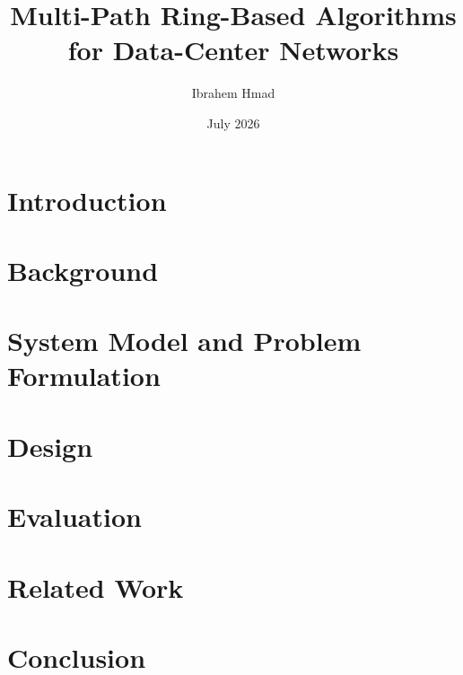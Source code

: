 \documentclass{article}
\title{Multi-Path Ring-Based Algorithms for Data-Center Networks}
\author{Ibrahem Hmad}
\date{July 2026}
\begin{document}
\maketitle

\begin{abstract}

\end{abstract}

\section{Introduction}
\section{Background}
\section{System Model and Problem Formulation}
\section{Design}
\section{Evaluation}
\section{Related Work}
\section{Conclusion}
\end{document}
